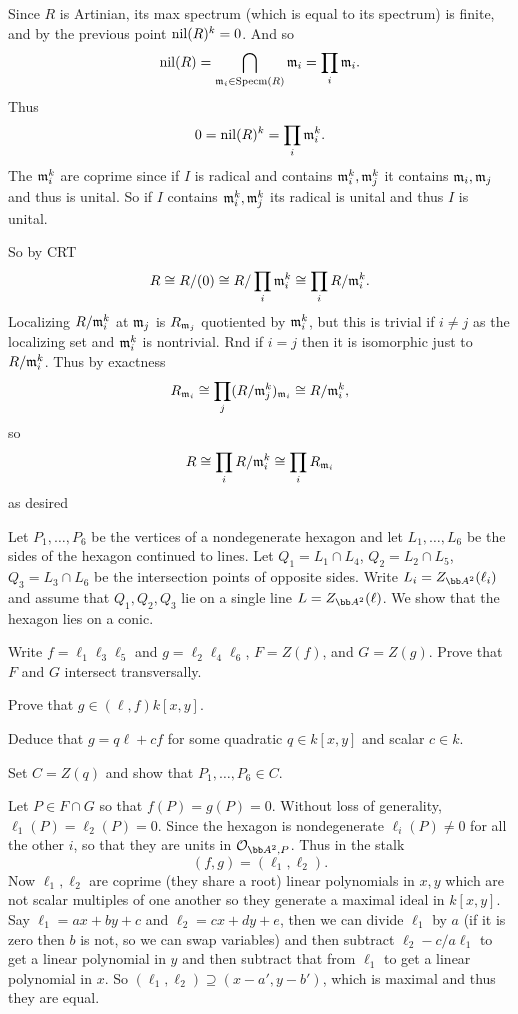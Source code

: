     \item Since $R$ is Artinian, its max spectrum (which is equal to its spectrum) is finite, and by the previous point ${\rm nil}(R)^k=0$.
    And so
    $$ {\rm nil}(R) = \bigcap_{{{\frak m}}_i\in{\rm Specm}(R)}{{\frak m}}_i = \prod_i{{\frak m}}_i . $$
    Thus
    $$ 0 = {\rm nil}(R)^k = \prod_i{{\frak m}}_i^k . $$
    The ${{\frak m}}_i^k$ are coprime since if $I$ is radical and contains ${{\frak m}}_i^k,{{\frak m}}_j^k$ it contains ${{\frak m}}_i,{{\frak m}}_j$ and thus is unital.
    So if $I$ contains ${{\frak m}}_i^k,{{\frak m}}_j^k$ its radical is unital and thus $I$ is unital.

    So by CRT
    $$ R \cong R/(0) \cong R/\prod_i{{\frak m}}_i^k \cong \prod_iR/{{\frak m}}_i^k . $$
    Localizing $R/{{\frak m}}_i^k$ at ${{\frak m}}_j$ is $R_{{{\frak m}}_j}$ quotiented by ${{\frak m}}_i^k$, but this is trivial if $i\neq j$ as the localizing set and ${{\frak m}}_i^k$
    is nontrivial.
    Rnd if $i=j$ then it is isomorphic just to $R/{{\frak m}}_i^k$.
    Thus by exactness
    $$ R_{{{\frak m}}_i} \cong \prod_j(R/{{\frak m}}_j^k)_{{{\frak m}}_i} \cong R/{{\frak m}}_i^k , $$
    so
    $$ R \cong \prod_iR/{{\frak m}}_i^k \cong \prod_iR_{{{\frak m}}_i} $$
    as desired
\eenum

\bprob

    Let $P_1,\dots,P_6$ be the vertices of a nondegenerate hexagon and let $L_1,\dots,L_6$ be the sides of the hexagon continued to lines.
    Let $Q_1=L_1\cap L_4$, $Q_2=L_2\cap L_5$, $Q_3=L_3\cap L_6$ be the intersection points of opposite sides.
    Write $L_i=Z_{\bA^2}(\ell_i)$ and assume that $Q_1,Q_2,Q_3$ lie on a single line $L=Z_{\bA^2}(\ell)$.
    We show that the hexagon lies on a conic.
    \benum
        \item Write $f=\ell_1\ell_3\ell_5$ and $g=\ell_2\ell_4\ell_6$, $F=Z(f)$, and $G=Z(g)$.
        Prove that $F$ and $G$ intersect transversally.

        \item Prove that $g\in(\ell,f)k[x,y]$.

        \item Deduce that $g=q\ell+cf$ for some quadratic $q\in k[x,y]$ and scalar $c\in k$.

        \item Set $C=Z(q)$ and show that $P_1,\dots,P_6\in C$.
    \eenum

\eprob

\benum
    \item Let $P\in F\cap G$ so that $f(P)=g(P)=0$.
    Without loss of generality, $\ell_1(P)=\ell_2(P)=0$.
    Since the hexagon is nondegenerate $\ell_i(P)\neq0$ for all the other $i$, so that they are units in $\O_{\bA^2,P}$.
    Thus in the stalk
    $$ (f,g) = (\ell_1,\ell_2) . $$
    Now $\ell_1,\ell_2$ are coprime (they share a root) linear polynomials in $x,y$ which are not scalar multiples of one another so they generate a
    maximal ideal in $k[x,y]$.
    Say $\ell_1=ax+by+c$ and $\ell_2=cx+dy+e$, then we can divide $\ell_1$ by $a$ (if it is zero then $b$ is not, so we can swap variables)
    and then subtract $\ell_2-c/a\ell_1$ to get a linear polynomial in $y$ and then subtract that from $\ell_1$ to get a linear polynomial in $x$.
    So $(\ell_1,\ell_2)\supseteq(x-a',y-b')$, which is maximal and thus they are equal.

